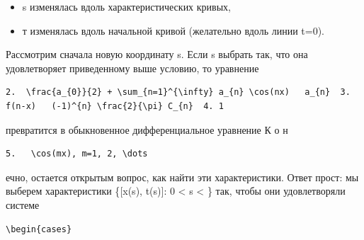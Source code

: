 \documentclass[
  ukrainian,
]{article}
\providecommand{\tightlist}{%
  \setlength{\itemsep}{0pt}\setlength{\parskip}{0pt}}
\begin{document}
\begin{itemize}
\tightlist
\item
  s изменялась вдоль характеристических кривых,
\item
  т изменялась вдоль начальной кривой (желательно вдоль линии t=0).
\end{itemize}

Рассмотрим сначала новую координату s. Если s выбрать так, что она
удовлетворяет приведенному выше условию, то уравнение

\begin{verbatim}
2.  \frac{a_{0}}{2} + \sum_{n=1}^{\infty} a_{n} \cos(nx)   a_{n}  3.  f(n-x)   (-1)^{n} \frac{2}{\pi} C_{n}  4. 1
\end{verbatim}

превратится в обыкновенное дифференциальное уравнение К о н

\begin{verbatim}
5.   \cos(mx), m=1, 2, \dots
\end{verbatim}

ечно, остается открытым вопрос, как найти эти характеристики. Ответ
прост: мы выберем характеристики \{{[}x(s), t(s){]}: 0 \textless{} s
\textless{} \infty\} так, чтобы они удовлетворяли системе

\begin{verbatim}
\begin{cases}
\end{verbatim}
\end{document}
